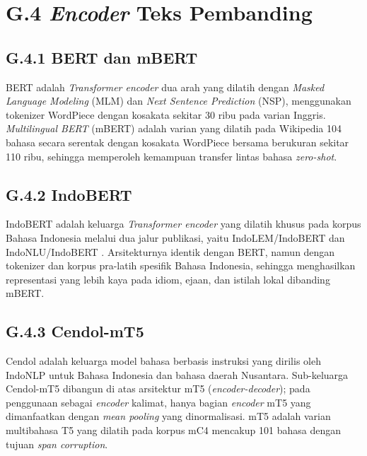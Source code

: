 \section*{G.4 \textit{Encoder} Teks Pembanding}
\label{app:textencoder-detail}

\subsection*{G.4.1 BERT dan mBERT}

BERT \citep{devlinBERT2019} adalah \textit{Transformer encoder} dua arah yang dilatih dengan \textit{Masked Language Modeling} (MLM) dan \textit{Next Sentence Prediction} (NSP), menggunakan tokenizer WordPiece dengan kosakata sekitar 30 ribu pada varian Inggris. \textit{Multilingual BERT} (mBERT) adalah varian yang dilatih pada Wikipedia 104 bahasa secara serentak dengan kosakata WordPiece bersama berukuran sekitar 110 ribu, sehingga memperoleh kemampuan transfer lintas bahasa \textit{zero-shot}.

\subsection*{G.4.2 IndoBERT}

IndoBERT \citep{kotoIndoLEM2020,wilieIndoNLU2020} adalah keluarga \textit{Transformer encoder} yang dilatih khusus pada korpus Bahasa Indonesia melalui dua jalur publikasi, yaitu IndoLEM/IndoBERT \citep{kotoIndoLEM2020} dan IndoNLU/IndoBERT \citep{wilieIndoNLU2020}. Arsitekturnya identik dengan BERT, namun dengan tokenizer dan korpus pra-latih spesifik Bahasa Indonesia, sehingga menghasilkan representasi yang lebih kaya pada idiom, ejaan, dan istilah lokal dibanding mBERT.

\subsection*{G.4.3 Cendol-mT5}

Cendol \citep{cahyawijayaCendol2024} adalah keluarga model bahasa berbasis instruksi yang dirilis oleh IndoNLP untuk Bahasa Indonesia dan bahasa daerah Nusantara. Sub-keluarga Cendol-mT5 dibangun di atas arsitektur mT5 (\textit{encoder-decoder}); pada penggunaan sebagai \textit{encoder} kalimat, hanya bagian \textit{encoder} mT5 yang dimanfaatkan dengan \textit{mean pooling} yang dinormalisasi. mT5 \citep{xueMT52021} adalah varian multibahasa T5 yang dilatih pada korpus mC4 mencakup 101 bahasa dengan tujuan \textit{span corruption}.

